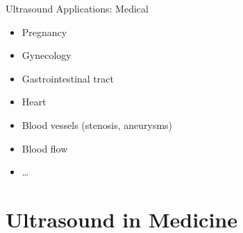 



\begin{frame}[c]{Ultrasound Applications: Medical \cont}
    \begin{itemize}
        \item Pregnancy
        \item Gynecology
        \item Gastrointestinal tract
        \item Heart
        \item Blood vessels (stenosis, aneurysms)
        \item Blood flow
        \item \dots
    \end{itemize}

\end{frame}


\section{Ultrasound in Medicine}


